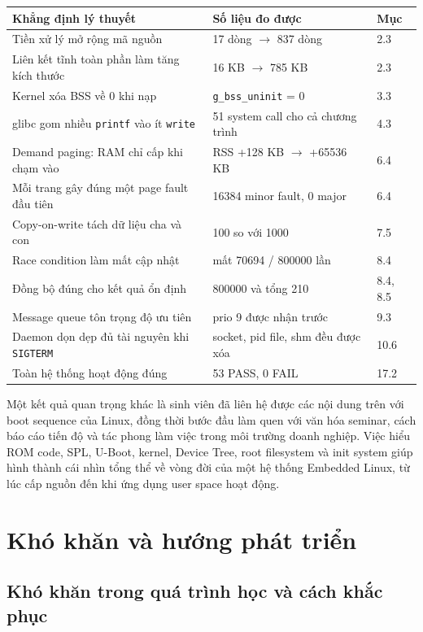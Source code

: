 \documentclass[11pt]{article}
\newcommand{\code}[1]{\texttt{#1}}
\begin{document}
\begin{center}
\begin{tabular}{p{5.6cm}p{4.2cm}p{4.0cm}}
\toprule
\textbf{Khẳng định lý thuyết} & \textbf{Số liệu đo được} & \textbf{Mục} \\
\midrule
Tiền xử lý mở rộng mã nguồn & 17 dòng $\rightarrow$ 837 dòng & 2.3 \\
Liên kết tĩnh toàn phần làm tăng kích thước & 16 KB $\rightarrow$ 785 KB & 2.3 \\
Kernel xóa BSS về 0 khi nạp & \code{g\_bss\_uninit} = 0 & 3.3 \\
glibc gom nhiều \code{printf} vào ít \code{write} & 51 system call cho cả chương trình & 4.3 \\
Demand paging: RAM chỉ cấp khi chạm vào & RSS +128 KB $\rightarrow$ +65536 KB & 6.4 \\
Mỗi trang gây đúng một page fault đầu tiên & 16384 minor fault, 0 major & 6.4 \\
Copy-on-write tách dữ liệu cha và con & 100 so với 1000 & 7.5 \\
Race condition làm mất cập nhật & mất 70694 / 800000 lần & 8.4 \\
Đồng bộ đúng cho kết quả ổn định & 800000 và tổng 210 & 8.4, 8.5 \\
Message queue tôn trọng độ ưu tiên & prio 9 được nhận trước & 9.3 \\
Daemon dọn dẹp đủ tài nguyên khi \code{SIGTERM} & socket, pid file, shm đều được xóa & 10.6 \\
Toàn hệ thống hoạt động đúng & 53 PASS, 0 FAIL & 17.2 \\
\bottomrule
\end{tabular}
\end{center}

Một kết quả quan trọng khác là sinh viên đã liên hệ được các nội dung trên với boot sequence của Linux, đồng thời bước đầu làm quen với văn hóa seminar, cách báo cáo tiến độ và tác phong làm việc trong môi trường doanh nghiệp. Việc hiểu ROM code, SPL, U-Boot, kernel, Device Tree, root filesystem và init system giúp hình thành cái nhìn tổng thể về vòng đời của một hệ thống Embedded Linux, từ lúc cấp nguồn đến khi ứng dụng user space hoạt động.

\section{Khó khăn và hướng phát triển}

\subsection{Khó khăn trong quá trình học và cách khắc phục}
\end{document}
